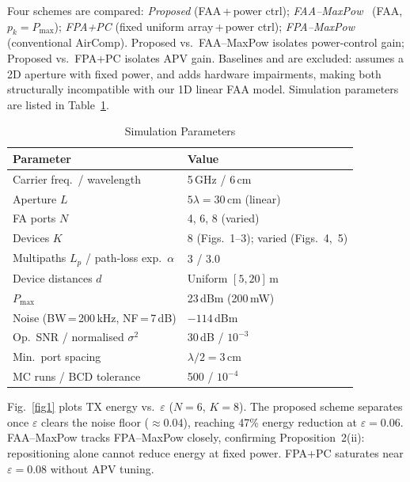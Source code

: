 \documentclass[journal,letterpaper,10pt,twocolumn]{IEEEtran}
\begin{document}
Four schemes are compared: \textit{Proposed} (FAA\,+\,power ctrl);
\textit{FAA--MaxPow}~\cite{Zhang2024} (FAA, $p_{k}\!=\!P_{\max}$);
\textit{FPA+PC} (fixed uniform array\,+\,power ctrl);
\textit{FPA--MaxPow} (conventional AirComp). Proposed
vs.\ FAA--MaxPow isolates power-control gain; Proposed
vs.\ FPA+PC isolates APV gain. Baselines \cite{Li2025} and
\cite{LiHW2024} are excluded: \cite{Li2025} assumes a 2D aperture with
fixed power, and \cite{LiHW2024} adds hardware impairments, making both
structurally incompatible with our 1D linear FAA model.
Simulation parameters are listed in Table~\ref{tab:params}.

\begin{table}[!t]
  \caption{Simulation Parameters}
  \label{tab:params}
  \centering
  \small
  \begin{tabular}{@{}ll@{}}
    \toprule
    Parameter & Value\\
    \midrule
    Carrier freq.\ / wavelength       & 5\,GHz / 6\,cm\\
    Aperture $L$                      & $5\lambda=30$\,cm (linear)\\
    FA ports $N$                      & 4, 6, 8 (varied)\\
    Devices $K$                       & 8 (Figs.~1--3); varied (Figs.~4,~5)\\
    Multipaths $L_{p}$ / path-loss exp.\ $\alpha$ & 3 / 3.0\\
    Device distances $d$              & Uniform $[5,20]$\,m\\
    $P_{\max}$                        & 23\,dBm (200\,mW)\\
    Noise (BW\,=\,200\,kHz, NF\,=\,7\,dB) & $-114$\,dBm\\
    Op.\ SNR / normalised $\sigma^{2}$ & 30\,dB / $10^{-3}$\\
    Min.\ port spacing                & $\lambda/2=3$\,cm\\
    MC runs / BCD tolerance           & 500 / $10^{-4}$\\
    \bottomrule
  \end{tabular}
\end{table}

Fig.~\ref{fig1} plots TX energy vs.\ $\varepsilon$ ($N\!=\!6$,
$K\!=\!8$). The proposed scheme separates once $\varepsilon$ clears the
noise floor ($\approx\!0.04$), reaching 47\% energy reduction at
$\varepsilon\!=\!0.06$. FAA--MaxPow tracks FPA--MaxPow closely,
confirming Proposition~2(ii): repositioning alone cannot reduce energy
at fixed power. FPA+PC saturates near $\varepsilon\!=\!0.08$ without
APV tuning.
\end{document}
